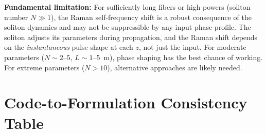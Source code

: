 \documentclass[12pt,a4paper]{article}
\theoremstyle{definition}
\begin{document}
\begin{advisory}
\textbf{Fundamental limitation:} For sufficiently long fibers or high powers (soliton number $N \gg 1$), the Raman self-frequency shift is a robust consequence of the soliton dynamics and may not be suppressible by any input phase profile. The soliton adjusts its parameters during propagation, and the Raman shift depends on the \emph{instantaneous} pulse shape at each $z$, not just the input. For moderate parameters ($N \sim 2$--$5$, $L \sim 1$--$5$~m), phase shaping has the best chance of working. For extreme parameters ($N > 10$), alternative approaches are likely needed.
\end{advisory}


\section{Code-to-Formulation Consistency Table}
\label{sec:consistency}
\end{document}
